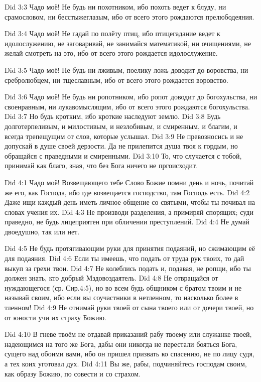 \vs Did 3:3
Чадо моё!
Не будь ни похотником, ибо похоть ведет к блуду,
ни срамословом,
ни бесстыжеглазым, ибо от всего этого рождаются прелюбодеяния.

\vs Did 3:4
Чадо моё!
Не гадай по полёту птиц, ибо птицегадание ведет к идолослужению,
не заговаривай,
не занимайся математикой,
ни очищениями,
не желай смотреть на это, ибо от всего этого рождается идолослужение.

\vs Did 3:5
Чадо моё!
Не будь ни лживым, поелику ложь доводит до воровства,
ни сребролюбцем,
ни тщеславным, ибо от всего этого рождается воровство.

\vs Did 3:6
Чадо моё!
Не будь ни ропотником, ибо ропот доводит до богохульства,
ни своенравным,
ни лукавомыслящим, ибо от всего этого рождаются богохульства.
\vs Did 3:7
Но будь кротким, ибо кроткие наследуют землю.
\vs Did 3:8
Будь долготерпеливым, и милостивым, и незлобивым, и смиренным,
и благим, и всегда трепещущим от слов, которые услышал.
\vs Did 3:9
Не превозносись и не допускай в душе своей дерзости.
Да не прилепится душа твоя к гордым,
но обращайся с праведными и смиренными.
\vs Did 3:10
То, что случается с тобой, принимай как благо,
зная, что без Бога ничего не пргоисходит.

\vs Did 4:1
Чадо моё!
Возвещающего тебе Слово Божие помни день и ночь,
почитай же его, как Господа, ибо где возвещается господство,
там Господь есть.
\vs Did 4:2
Даже ищи каждый день иметь личное общение со святыми,
чтобы ты почивал на словах учения их.
\vs Did 4:3
Не производи разделения, а примиряй спорящих; суди праведно, не
будь лицеприятен при обличении преступлений.
\vs Did 4:4
Не думай двоедушно, так или нет.

\vs Did 4:5
Не будь протягивающим руки для принятия подаяний,
но сжимающим её для подаяния.
\vs Did 4:6
Если ты имеешь, что подать от труда рук твоих,
то дай выкуп за грехи твои.
\vs Did 4:7
Не колеблись подать и, подавая, не ропщи,
ибо ты должен знать, кто добрый Мздовоздаятель.
\vs Did 4:8
Не отвращайся от нуждающегося (ср. Сир.4:5), но во всем будь
общником с братом твоим и  не называй своим,
ибо если вы соучастники в нетленном, то насколько более в тленном!
\vs Did 4:9
Не отнимай руки твоей от сына твоего или от дочери твоей,
но от юности учи их страху Божию.

\vs Did 4:10
В гневе твоём не отдавай приказаний рабу твоему или служанке твоей,
надеющимся на того же Бога, дабы они никогда не перестали бояться Бога,
сущего над обоими вами, ибо он пришел призвать ко спасению,
не по лицу судя, а тех коих уготовал дух.
\vs Did 4:11
Вы же, рабы, подчиняйтесь господам своим, как образу Божию,
по совести и со страхом.

